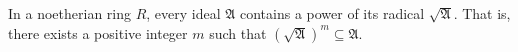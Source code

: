 In a noetherian ring $R$, every ideal $\mathfrak{A}$ contains a power of its radical $\sqrt{\mathfrak{A}}$. That is, there exists a positive integer $m$ such that $(\sqrt{\mathfrak{A}})^m \subseteq \mathfrak{A}$.
